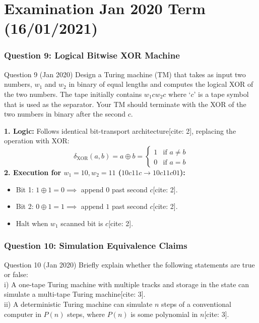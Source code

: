 \documentclass[11pt,a4paper]{article}
\begin{document}
\part{Examination Jan 2020 Term (16/01/2021)}

\section{Question 9: Logical Bitwise XOR Machine}
\begin{questionbox}{Question 9 (Jan 2020)}
Design a Turing machine (TM) that takes as input two numbers, $w_1$ and $w_2$ in binary of equal lengths and computes the logical XOR of the two numbers. The tape initially contains $w_1 c w_2 c$ where `$c$' is a tape symbol that is used as the separator. Your TM should terminate with the XOR of the two numbers in binary after the second $c$.
\end{questionbox}

\begin{solutionbox}
\textbf{1. Logic:}
Follows identical bit-transport architecture[cite: 2], replacing the operation with XOR:
$$\delta_{\text{XOR}}(a, b) = a \oplus b = \begin{cases} 1 & \text{if } a \ne b \\ 0 & \text{if } a = b \end{cases}$$
\textbf{2. Execution for $w_1 = 10, w_2 = 11$ ($10c11c \rightarrow 10c11c01$):}
\begin{itemize}[leftmargin=*]
    \item Bit 1: $1 \oplus 1 = 0 \implies$ append $0$ past second $c$[cite: 2].
    \item Bit 2: $0 \oplus 1 = 1 \implies$ append $1$ past second $c$[cite: 2].
    \item Halt when $w_1$ scanned bit is $c$[cite: 2].
\end{itemize}
\end{solutionbox}

\section{Question 10: Simulation Equivalence Claims}
\begin{questionbox}{Question 10 (Jan 2020)}
Briefly explain whether the following statements are true or false: \\
i) A one-tape Turing machine with multiple tracks and storage in the state can simulate a multi-tape Turing machine[cite: 3]. \\
ii) A deterministic Turing machine can simulate $n$ steps of a conventional computer in $P(n)$ steps, where $P(n)$ is some polynomial in $n$[cite: 3].
\end{questionbox}
\end{document}
